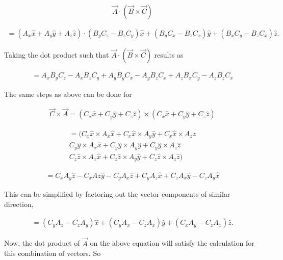 \documentclass[11pt]{article}
\begin{document}
$$
\vec{A} \cdot (\vec{B} \times \vec{C})
$$

\begin{eqnarray*}
= (A_{x}\hat{x} + A_{y}\hat{y} + A_{z}\hat{z}) \cdot
(B_{y}C_{z} - B_{z}C_{y})\hat{x} 
+ (B_{y}C_{x} - B_{z}C_{x})\hat{y}
+ (B_{x}C_{y} - B_{z}C_{x})\hat{z}.
\end{eqnarray*}

Taking the dot product such that $\vec{A} \cdot (\vec{B} \times \vec{C})$
results as
    
\begin{eqnarray*}
= A_{x}B_{y}C_{z} - A_{x}B_{z}C_{y} + A_{y}B_{y}C_{x} 
- A_{y}B_{z}C_{x} + A_{z}B_{x}C_{y} - A_{z}B_{z}C_{x}
\end{eqnarray*}


The same steps as above can be done for

\begin{eqnarray*}
\vec{C} \times \vec{A} = 
(C_{x}\hat{x} + C_{y}\hat{y} + C_{z}\hat{z}) \times
(C_{x}\hat{x} + C_{y}\hat{y} + C_{z}\hat{z}) 
\end{eqnarray*}

\begin{eqnarray*}
= ( 
C_{x}\hat{x} \times A_{x}\hat{x} + C_{x}\hat{x} \times A_{y}\hat{y} + C_{x}\hat{x} \times A_{z}\hat{z} \\
C_{y}\hat{y} \times A_{x}\hat{x} + C_{y}\hat{y} \times A_{y}\hat{y} + C_{y}\hat{y} \times A_{z}\hat{z} \\
C_{z}\hat{z} \times A_{x}\hat{x} + C_{z}\hat{z} \times A_{y}\hat{y} + C_{z}\hat{z} \times A_{z}\hat{z} 
) 
\end{eqnarray*}

\begin{eqnarray*}
= C_{x}A_{y}\hat{z} - C_{x}A{z}\hat{y} 
- C_{y}A_{x}\hat{z} + C_{y}A_{z}\hat{x} 
+ C_{z}A_{x}\hat{y} - C_{z}A_{y}\hat{x}
\end{eqnarray*}

This can be simplified by factoring out the vector components of similar direction,

\begin{eqnarray*}
= (C_{y}A_{z} - C_{z}A_{y})\hat{x} 
+ (C_{y}A_{x} - C_{z}A_{x})\hat{y}
+ (C_{x}A_{y} - C_{z}A_{x})\hat{z}.
\end{eqnarray*}

Now, the dot product of $\vec{A}$ on the above equation will satisfy 
the calculation for this combination of vectors. So 
\end{document}
